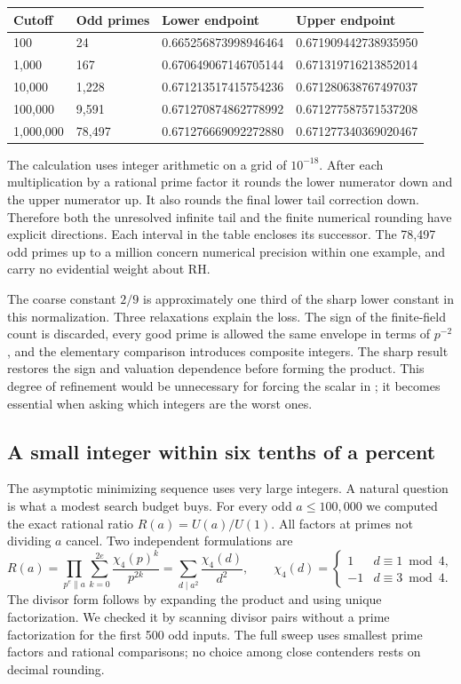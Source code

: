 \documentclass[12pt,letterpaper]{article}
\newcommand{\code}[1]{\texttt{\detokenize{#1}}}
\begin{document}
\begin{center}\small\begin{tabular}{llll}\toprule Cutoff & Odd primes & Lower endpoint & Upper endpoint\\\midrule 
100 & 24 & 0.665256873998946464 & 0.671909442738935950\\
1,000 & 167 & 0.670649067146705144 & 0.671319716213852014\\
10,000 & 1,228 & 0.671213517415754236 & 0.671280638767497037\\
100,000 & 9,591 & 0.671270874862778992 & 0.671277587571537208\\
1,000,000 & 78,497 & 0.671276669092272880 & 0.671277340369020467\\\bottomrule\end{tabular}\end{center}
The calculation uses integer arithmetic on a grid of \(10^{-18}\). After each multiplication by a rational prime factor it rounds the lower numerator down and the upper numerator up. It also rounds the final lower tail correction down. Therefore both the unresolved infinite tail and the finite numerical rounding have explicit directions. Each interval in the table encloses its successor. The 78,497 odd primes up to a million concern numerical precision within one example, and carry no evidential weight about RH.

The coarse constant \(2/9\) is approximately one third of the sharp lower constant in this normalization. Three relaxations explain the loss. The sign of the finite-field count is discarded, every good prime is allowed the same envelope in terms of \(p^{-2}\), and the elementary comparison introduces composite integers. The sharp result restores the sign and valuation dependence before forming the product. This degree of refinement would be unnecessary for forcing the scalar in \code{sw_one}; it becomes essential when asking which integers are the worst ones.

\clearpage\subsection{A small integer within six tenths of a percent}
The asymptotic minimizing sequence uses very large integers. A natural question is what a modest search budget buys. For every odd \(a\le100{,}000\) we computed the exact rational ratio \(R(a)=U(a)/U(1)\). All factors at primes not dividing \(a\) cancel. Two independent formulations are
\[
 R(a)=\prod_{p^e\parallel a}\sum_{k=0}^{2e}
       \frac{\chi_4(p)^k}{p^{2k}}
     =\sum_{d\mid a^2}\frac{\chi_4(d)}{d^2},
 \qquad
 \chi_4(d)=\begin{cases}1&d\equiv1\bmod4,\\-1&d\equiv3\bmod4.\end{cases}
\]
The divisor form follows by expanding the product and using unique factorization. We checked it by scanning divisor pairs without a prime factorization for the first 500 odd inputs. The full sweep uses smallest prime factors and rational comparisons; no choice among close contenders rests on decimal rounding.
\end{document}
